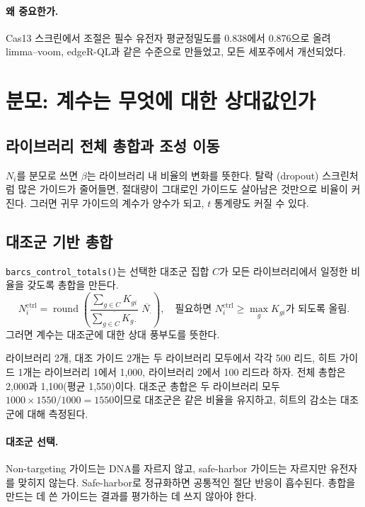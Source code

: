 \documentclass[11pt]{article}
\begin{document}
\paragraph{왜 중요한가.} Cas13 스크린에서 조절은 필수 유전자 평균정밀도를
0.838에서 0.876으로 올려 limma--voom, edgeR-QL과 같은 수준으로 만들었고, 모든
세포주에서 개선되었다.

\section{분모: 계수는 무엇에 대한 상대값인가}

\subsection{라이브러리 전체 총합과 조성 이동}

$N_i$를 분모로 쓰면 $\beta$는 라이브러리 내 비율의 변화를 뜻한다. 탈락
(dropout) 스크린처럼 많은 가이드가 줄어들면, 절대량이 그대로인 가이드도 살아남은
것만으로 비율이 커진다. 그러면 귀무 가이드의 계수가 양수가 되고, $t$ 통계량도
커질 수 있다.

\subsection{대조군 기반 총합}

\texttt{barcs\_control\_totals()}는 선택한 대조군 집합 $C$가 모든 라이브러리에서
일정한 비율을 갖도록 총합을 만든다.
\begin{equation}
N_i^{\text{ctrl}}=\operatorname{round}\!\left(
\frac{\sum_{g\in C}K_{gi}}{\overline{\sum_{g\in C}K_{g\cdot}}}\;
\overline{N_\cdot}\right),
\quad\text{필요하면 } N_i^{\text{ctrl}}\ge\max_g K_{gi}\text{가 되도록 올림.}
\end{equation}
그러면 계수는 대조군에 대한 상대 풍부도를 뜻한다.

\begin{example}[: 대조군 총합]
라이브러리 2개, 대조 가이드 2개는 두 라이브러리 모두에서 각각 500 리드, 히트
가이드 1개는 라이브러리 1에서 1,000, 라이브러리 2에서 100 리드라 하자. 전체
총합은 2,000과 1,100(평균 1,550)이다. 대조군 총합은 두 라이브러리 모두
$1000\times1550/1000=1550$이므로 대조군은 같은 비율을 유지하고, 히트의 감소는
대조군에 대해 측정된다.
\end{example}

\paragraph{대조군 선택.} Non-targeting 가이드는 DNA를 자르지 않고, safe-harbor
가이드는 자르지만 유전자를 맞히지 않는다. Safe-harbor로 정규화하면 공통적인
절단 반응이 흡수된다. 총합을 만드는 데 쓴 가이드는 결과를 평가하는 데 쓰지
않아야 한다.
\end{document}
